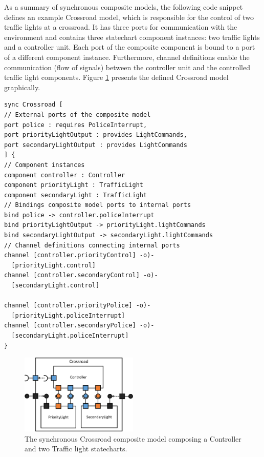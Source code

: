 As a summary of synchronous composite models, the following code snippet defines an example Crossroad model, which is responsible for the control of two traffic lights at a crossroad. It has three ports for communication with the environment and contains three statechart component instances: two traffic lights and a controller unit. Each port of the composite component is bound to a port of a different component instance. Furthermore, channel definitions enable the communication (flow of signals) between the controller unit and the controlled traffic light components. Figure \ref{fig:crossroads-composite-model} presents the defined Crossroad model graphically.
\begin{lstlisting}
sync Crossroad [
// External ports of the composite model
port police : requires PoliceInterrupt,
port priorityLightOutput : provides LightCommands,
port secondaryLightOutput : provides LightCommands
] {
// Component instances
component controller : Controller
component priorityLight : TrafficLight
component secondaryLight : TrafficLight
// Bindings composite model ports to internal ports
bind police -> controller.policeInterrupt
bind priorityLightOutput -> priorityLight.lightCommands
bind secondaryLightOutput -> secondaryLight.lightCommands
// Channel definitions connecting internal ports
channel [controller.priorityControl] -o)-
  [priorityLight.control]
channel [controller.secondaryControl] -o)-
  [secondaryLight.control]

channel [controller.priorityPolice] -o)-
  [priorityLight.policeInterrupt]
channel [controller.secondaryPolice] -o)-
  [secondaryLight.policeInterrupt]
}
\end{lstlisting}

\begin{figure}[!h]
	\centering
	\includegraphics[width=0.50\textwidth]{figures/Controller-gcd.pdf}
	\caption{The synchronous Crossroad composite model composing a Controller and two Traffic light statecharts.}
	\label{fig:crossroads-composite-model}
\end{figure}

